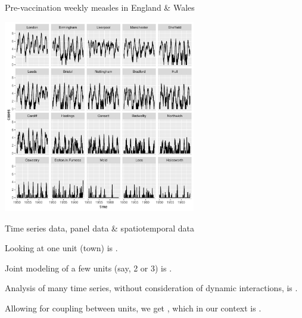 \documentclass{beamer}
\begin{document}
\begin{frame}{Pre-vaccination weekly measles in England \& Wales}

  
\vspace{-2mm}

\begin{center}
\includegraphics[width=8.4cm]{he10-data.pdf}


\end{center}

\vspace{-2mm}
  
\end{frame}

\begin{frame}{Time series data, panel data \& spatiotemporal data}

  \bi
\item Looking at one unit (town) is .

  \item Joint modeling of a few units (say, 2 or 3) is .

\item Analysis of many time series, without consideration of dynamic interactions, is .

\item Allowing for coupling between units, we get , which in our context is .

  \ei

  

\end{frame}
\end{document}
